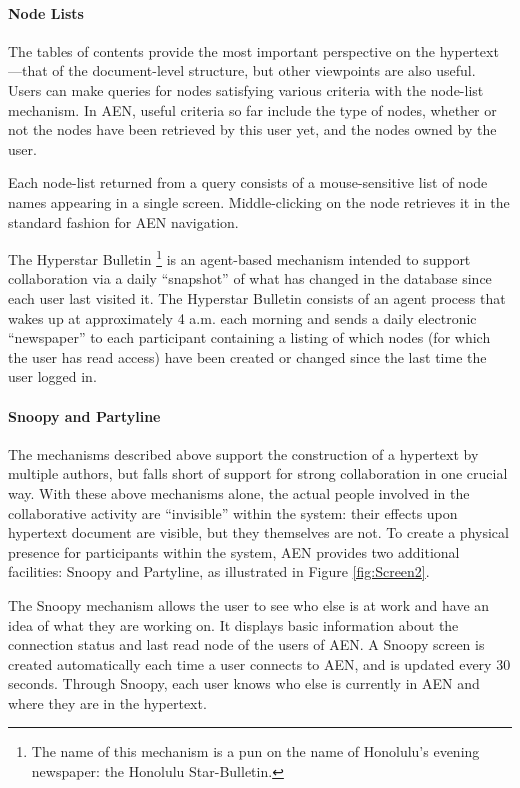 \paragraph{Node Lists}

The tables of contents provide the most important perspective on the
hypertext---that of the document-level structure, but other viewpoints are
also useful.  Users can make queries for nodes satisfying various criteria
with the node-list mechanism. In AEN, useful criteria so far include the
type of nodes, whether or not the nodes have been retrieved by this user
yet, and the nodes owned by the user.

Each node-list returned from a query consists of a mouse-sensitive
list of node names appearing in a single screen. Middle-clicking
on the node retrieves it in the standard fashion for AEN navigation.

The Hyperstar Bulletin \footnote{The name of this mechanism is a pun on the
name of Honolulu's evening newspaper: the Honolulu Star-Bulletin.} is an
agent-based mechanism intended to support collaboration via a daily
``snapshot'' of what has changed in the database since each user last
visited it.  The Hyperstar Bulletin consists of an agent process that wakes
up at approximately 4 a.m. each morning and sends a daily electronic
``newspaper'' to each participant containing a listing of which nodes (for
which the user has read access) have been created or changed since the last
time the user logged in.


\paragraph{Snoopy and Partyline}

The mechanisms described above support the construction of a hypertext by
multiple authors, but falls short of support for strong collaboration in
one crucial way.  With these above mechanisms alone, the actual people
involved in the collaborative activity are ``invisible'' within the system:
their effects upon hypertext document are visible, but they themselves are
not.  To create a physical presence for participants within the system, AEN
provides two additional facilities: Snoopy and Partyline, as illustrated in
Figure \ref{fig:Screen2}.

The Snoopy mechanism allows the user to see who else is at work and have an
idea of what they are working on.  It displays basic information about the
connection status and last read node of the users of AEN. A Snoopy screen
is created automatically each time a user connects to AEN, and is updated
every 30 seconds.  Through Snoopy, each user knows who else is currently in
AEN and where they are in the hypertext.

